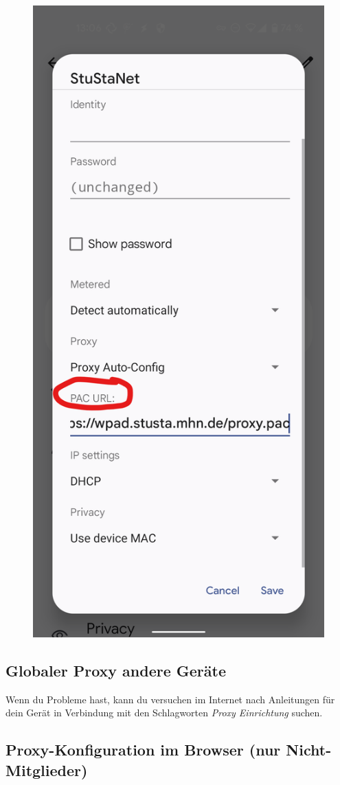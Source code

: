 \documentclass[a4paper,12pt]{scrartcl}
\begin{document}
\begin{figure}[h]
\begin{minipage}{0.20\textwidth}
		\includegraphics[width=0.7\linewidth,keepaspectratio]{Bilder/Android/android12_4}
	\end{minipage}
\end{figure}

\subsection{Globaler Proxy andere Geräte}

Wenn du Probleme hast, kann du versuchen im Internet nach Anleitungen für dein Gerät in Verbindung mit den Schlagworten \textit{Proxy Einrichtung} suchen.

\subsection{Proxy-Konfiguration im Browser (nur Nicht-Mitglieder)}
\label{Proxy}
\end{document}
